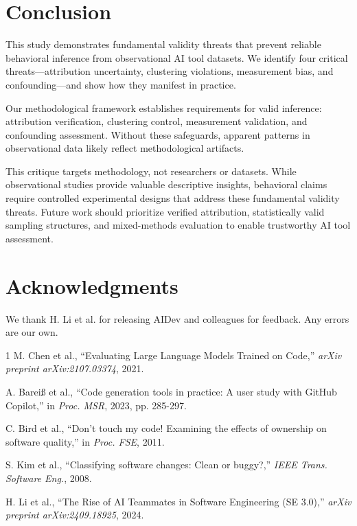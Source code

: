 \documentclass[conference]{IEEEtran}
\begin{document}
\section{Conclusion}

This study demonstrates fundamental validity threats that prevent reliable behavioral inference from observational AI tool datasets. We identify four critical threats—attribution uncertainty, clustering violations, measurement bias, and confounding—and show how they manifest in practice.

Our methodological framework establishes requirements for valid inference: attribution verification, clustering control, measurement validation, and confounding assessment. Without these safeguards, apparent patterns in observational data likely reflect methodological artifacts.

This critique targets methodology, not researchers or datasets. While observational studies provide valuable descriptive insights, behavioral claims require controlled experimental designs that address these fundamental validity threats. Future work should prioritize verified attribution, statistically valid sampling structures, and mixed-methods evaluation to enable trustworthy AI tool assessment.

\section*{Acknowledgments}
We thank H. Li et al. for releasing AIDev and colleagues for feedback. Any errors are our own.


\begin{thebibliography}{1}
M. Chen et al., ``Evaluating Large Language Models Trained on Code,'' \emph{arXiv preprint arXiv:2107.03374}, 2021.

A. Bareiß et al., ``Code generation tools in practice: A user study with GitHub Copilot,'' in \emph{Proc. MSR}, 2023, pp. 285-297.

C. Bird et al., ``Don't touch my code! Examining the effects of ownership on software quality,'' in \emph{Proc. FSE}, 2011.

S. Kim et al., ``Classifying software changes: Clean or buggy?,'' \emph{IEEE Trans. Software Eng.}, 2008.

H. Li et al., ``The Rise of AI Teammates in Software Engineering (SE 3.0),'' \emph{arXiv preprint arXiv:2409.18925}, 2024.
\end{thebibliography}

\balance
\end{document}
